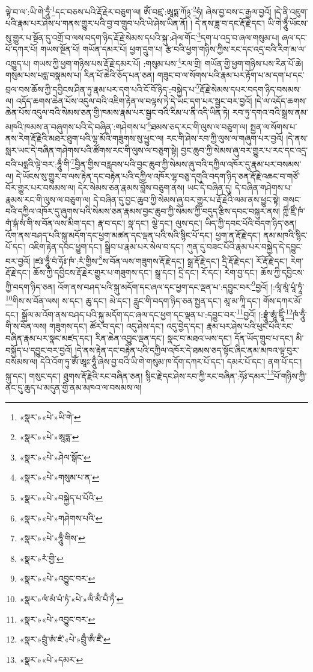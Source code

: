 ལྟེ་བ་ལ་:ཡི་གེ་ཧཱུྃ་\footnote{«སྣར་»«པེ་»ཡི་གེ་}དང་བཅས་པའི་རྡོ་རྗེར་བཅུག་ལ། ཨོཾ་བཛྲ་:ཨཱཏྨ་ཀོ྅་\footnote{«སྣར་»«པེ་»ཨཱཏྨ་}ཧཾ། ཞེས་བྱ་བས་ང་རྒྱལ་བྱའོ། །དེ་ནི་འཇུག་པའི་རྣམ་པར་ཤེས་པ་གནས་གྱུར་པའི་བྱ་བ་གྲུབ་པའི་ཡེ་ཤེས་ཡིན་ནོ། །
དེ་ནས་ཟླ་བ་དང་རྡོ་རྗེ་དང་། ཡི་གེ་ཧཱུྃ་ཡོངས་སུ་གྱུར་པ་སྔོན་དུ་འགྲོ་བ་ལས་བདག་ཉིད་རྡོ་རྗེ་སེམས་དཔའི་སྐུ་:ཤེལ་གོང་\footnote{«སྣར་»«པེ་»ཤེལ་སྒོང་}དག་པ་འདྲ་བ་ཞལ་གསུམ་པ། ཞལ་དང་པོ་དཀར་པོ། གཡས་སྔོན་པོ། གཡོན་དམར་པོ། ཕྱག་དྲུག་པ། རྩ་བའི་ཕྱག་གཉིས་ཀྱིས་རང་དང་འདྲ་བའི་རིག་མ་ལ་འཁྱུད་པ། གཡས་ཀྱི་ཕྱག་གཉིས་པས་རྡོ་རྗེ་དམར་པོ། :གསུམ་པས་\footnote{«སྣར་»«པེ་»གསུམ་པ་ན་}རལ་གྲི། གཡོན་གྱི་ཕྱག་གཉིས་པས་རིན་པོ་ཆེ། གསུམ་པས་པདྨ་བསྣམས་པ། རིན་པོ་ཆེའི་ཅོད་པན་ཅན། གཟུང་བ་ལ་སོགས་པའི་རྣམ་པར་རྟོག་པ་མ་དག་པ་དང་བྲལ་བས་ཆོས་ཀྱི་དབྱིངས་ཤིན་ཏུ་རྣམ་པར་དག་པའི་ངོ་བོ་ཉིད་:བསྐྱེད་པ་\footnote{«སྣར་»«པེ་»བསྐྱེད་པ་པོའི་}རྡོ་རྗེ་སེམས་དཔར་བདག་ཉིད་བསམས་ལ། འདོད་ཆགས་ཆེན་པོས་འདུལ་བའི་འཇིག་རྟེན་ལ་བལྟས་ཏེ་དེ་ཡང་དག་པར་སྦྱང་བར་བྱའོ། །དེ་ལ་འདོད་ཆགས་ཆེན་པོས་འདུལ་བའི་སེམས་ཅན་གྱི་ཁམས་རྣམ་པར་སྦྱང་བའི་རིམ་པ་ནི་འདི་ཡིན་ཏེ། རབ་ཏུ་དགའ་བའི་སྒྲས་ནམ་མཁའི་ཁམས་ན་བཞུགས་པའི་དེ་བཞིན་:གཤེགས་པ་\footnote{«སྣར་»«པེ་»གཤེགས་པའི་}ཐམས་ཅད་རང་གི་ལུས་ལ་བཅུག་ལ། སྤྱན་ལ་སོགས་པ་ནས་རེག་རྡོ་རྗེའི་མཐར་ཐུག་པའི་ལྷ་མོའི་གཟུགས་སུ་ཕྱུང་ལ། རང་གི་ཤེས་རབ་ཀྱི་ལུས་ལ་གཞུག་པར་བྱའོ། །དེ་ནས་སླར་ཡང་དེ་བཞིན་གཤེགས་པའི་ཚོགས་རང་གི་ལུས་ལ་བཅུག་སྟེ། བྱང་ཆུབ་ཀྱི་སེམས་ཞུ་བར་གྱུར་པ་རང་དང་འདྲ་བའི་པདྨའི་ལྟེ་བར་:ཧཱུྃ་གི་\footnote{«སྣར་»«པེ་»ཧཱུྃ་གིས་}བྱིན་གྱིས་བརླབས་པའི་བྱང་ཆུབ་ཀྱི་སེམས་ཞུ་བའི་དཀྱིལ་འཁོར་དུ་རྣམ་པར་བསམས་ལ། དེ་ཡོངས་སུ་གྱུར་བ་ལས་རྟེན་དང་བརྟེན་པའི་དཀྱིལ་འཁོར་ལྷ་བཅུ་དགུའི་བདག་ཉིད་ཅན་རྡོ་རྗེ་འཆང་བ་གཙོ་བོར་གྱུར་པར་བསམས་ལ། དེར་སེམས་ཅན་རྣམས་བློས་བཅུག་ནས། ཡང་དེ་བཞིན་དུ། དེ་བཞིན་གཤེགས་པ་རྣམས་རང་གི་ལུས་ལ་བཅུག་ལ། དེ་བཞིན་དུ་བྱང་ཆུབ་ཀྱི་སེམས་ཞུ་བར་གྱུར་པ་རྡོ་རྗེའི་ལམ་ནས་ཕྱུང་སྟེ། གསང་བའི་དཀྱིལ་འཁོར་དུ་ཞུགས་པའི་སེམས་ཅན་རྣམས་བྱང་ཆུབ་ཀྱི་སེམས་ཀྱི་བདུད་རྩིས་དབང་བསྐུར་ནས། ཀྵིཾ་ཛྲིཾ་ཁཾ་གཾ་ཥྐཾ་སཾ་གི་ས་བོན་ལས་མིག་དང་། རྣ་བ་དང་། སྣ་དང་། ལྕེ་དང་། ལུས་དང་། ཡིད་ཀྱི་དབང་པོའི་བདག་ཉིད་ཅན། འོག་ནས་བཤད་པའི་སྐུ་མདོག་དང་ཕྱག་མཚན་དང་ལྡན་པའི་སའི་སྙིང་པོ་དང་། ཕྱག་ན་རྡོ་རྗེ་དང་། ནམ་མཁའི་སྙིང་པོ་དང་། འཇིག་རྟེན་དབང་ཕྱུག་དང་། སྒྲིབ་པ་རྣམ་པར་སེལ་བ་དང་། ཀུན་དུ་བཟང་པོའི་རྣམ་པར་བསྐྱེད་དེ་དབྱུང་བར་བྱའོ། །ཛཿ་ཧཱུྃ་བཾ་ཧོཿ་ཁཾ་:རཾ་གྱིས་\footnote{«སྣར་»རཾ་གྱི་}ས་བོན་ལས་གཟུགས་རྡོ་རྗེ་དང་། སྒྲ་རྡོ་རྗེ་དང་། དྲི་རྡོ་རྗེ་དང་། རོ་རྡོ་རྗེ་དང་། རེག་རྡོ་རྗེ་དང་། ཆོས་ཀྱི་དབྱིངས་རྡོ་རྗེར་གྱུར་པ་གཟུགས་དང་། སྒྲ་དང་། དྲི་དང་། རོ་དང་། རེག་བྱ་དང་། ཆོས་ཀྱི་དབྱིངས་ཀྱི་བདག་ཉིད་ཅན། འོག་ནས་བཤད་པའི་སྐུ་མདོག་དང་ཞལ་དང་ཕྱག་དང་ལྡན་པ་:དབྱུང་བར་\footnote{«སྣར་»«པེ་»འབྱུང་བར་}བྱའོ། །:ལཱཾ་མཱཾ་པཱཾ་ཏཱཾ་\footnote{«སྣར་»ལཾ་མཾ་པཾ་ཏཾ་«པེ་»ལྃ་མྃ་པྃ་ཏྃ་}གིས་ས་བོན་ལས། ས་དང་། ཆུ་དང་། མེ་དང་། རླུང་གི་བདག་ཉིད་ཅན་སྤྱན་དང་། མཱ་མ་ཀཱི་དང་། གོས་དཀར་མོ་དང་། སྒྲོལ་མ་འོག་ནས་བཤད་པའི་སྐུ་མདོག་དང་ཞལ་དང་ཕྱག་དང་ལྡན་པ་:དབྱུང་བར་\footnote{«སྣར་»«པེ་»འབྱུང་བར་}བྱའོ། །:བྷྲཱུཾ་ཨཱཾ་ཛྲཱིཾ་\footnote{«སྣར་»བྲུཾ་ཨཾ་ཛཾ་«པེ་»བྲུྃ་ཨྃ་ཛྃ་}ཁཾ་ཧཱུྃ་གི་ས་བོན་ལས། གཟུགས་དང་། ཚོར་བ་དང་། འདུ་ཤེས་དང་། འདུ་བྱེད་དང་། རྣམ་པར་ཤེས་པའི་ཕུང་པོའི་རང་བཞིན་རྣམ་པར་སྣང་མཛད་དང་། རིན་ཆེན་འབྱུང་ལྡན་དང་། སྣང་བ་མཐའ་ཡས་དང་། དོན་ཡོད་གྲུབ་པ་དང་། མི་བསྐྱོད་པ་དབྱུང་བར་བྱའོ། །དེ་ནས་རྟེན་དང་བརྟེན་པའི་དཀྱིལ་འཁོར་དེ་ཐམས་ཅད་སྟོང་ཞིང་ནམ་མཁའ་ལྟ་བུར་བསམས་ལ། དེའི་འོག་ཏུ་ཨོཾ་ཨཱཿ་ཧཱུྃ་ཞེས་བྱ་བའི་ཡི་གེ་གསུམ་ཁ་དོག་དཀར་པོ་དང་། དམར་པོ་དང་། ནག་པོ་དང་། སྐུ་དང་། གསུང་དང་། ཐུགས་རྡོ་རྗེའི་རང་བཞིན་ཅན། སྙིང་རྗེ་དང་ཤེས་རབ་ཀྱི་རང་བཞིན་:ཧོཿ་དམར་\footnote{«སྣར་»«པེ་»དམར་}པོ་གཉིས་ཀྱི་ནང་དུ་ཆུད་པ་མདུན་གྱི་ནམ་མཁའ་ལ་བསམས་ལ། 